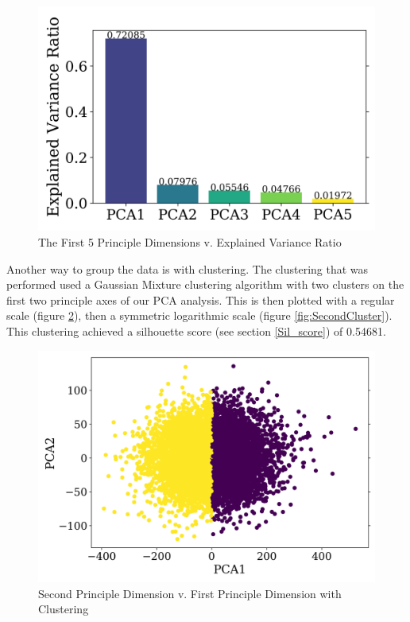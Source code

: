 \documentclass{article}
\begin{document}
\begin{figure}[H]%
\centering
\includegraphics[scale=0.75]{supporting_images/FirstPCA.png}%
\caption{The First 5 Principle Dimensions v. Explained Variance Ratio}
\label{fig:FirstPCA}
\end{figure}

\par
Another way to group the data is with clustering. The clustering that was performed used a Gaussian Mixture clustering algorithm with two clusters on the first two principle axes of our PCA analysis. This is then plotted with a regular scale (figure \ref{fig:FirstCluster}), then a symmetric logarithmic scale (figure \ref{fig:SecondCluster}). This clustering achieved a silhouette score (see section \ref{Sil_score}) of 0.54681.

\begin{figure}[H]
\centering
\includegraphics[scale=0.59]{supporting_images/FirstCluster.png}%
\caption{Second Principle Dimension v. First Principle Dimension with Clustering}
\label{fig:FirstCluster}
\end{figure}
\end{document}
